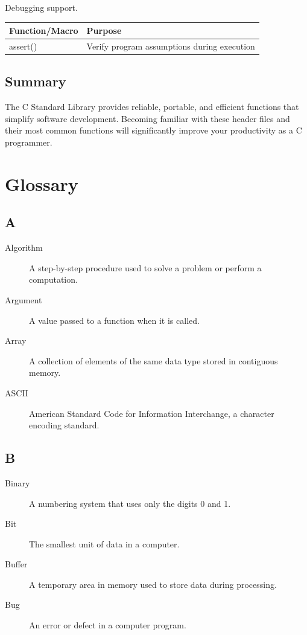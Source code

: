 \documentclass[12pt,openany]{book}
\begin{document}
Debugging support.

\begin{center}
\begin{tabular}{|l|p{8cm}|}
\hline
Function/Macro & Purpose \\
\hline
assert() & Verify program assumptions during execution \\
\hline
\end{tabular}
\end{center}

\section{Summary}

The C Standard Library provides reliable, portable, and efficient functions that simplify software development. Becoming familiar with these header files and their most common functions will significantly improve your productivity as a C programmer.
\backmatter

\chapter{Glossary}

\section*{A}

\begin{description}
    \item[Algorithm] A step-by-step procedure used to solve a problem or perform a computation.
    \item[Argument] A value passed to a function when it is called.
    \item[Array] A collection of elements of the same data type stored in contiguous memory.
    \item[ASCII] American Standard Code for Information Interchange, a character encoding standard.
\end{description}

\section*{B}

\begin{description}
    \item[Binary] A numbering system that uses only the digits 0 and 1.
    \item[Bit] The smallest unit of data in a computer.
    \item[Buffer] A temporary area in memory used to store data during processing.
    \item[Bug] An error or defect in a computer program.
\end{description}
\end{document}
